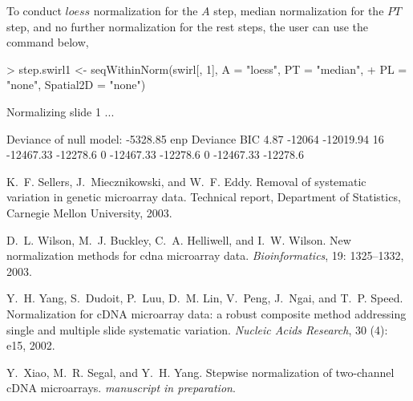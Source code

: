 \documentclass[11pt]{article}
\begin{document}
To conduct $loess$ normalization for the $A$ step, median normalization for the $PT$ step, and
no further normalization for the rest steps, the user can use the command below,

\begin{Schunk}
\begin{Sinput}
> step.swirl1 <- seqWithinNorm(swirl[, 1], A = "loess", PT = "median", 
+     PL = "none", Spatial2D = "none")
\end{Sinput}
\begin{Soutput}
Normalizing slide  1 ...

Deviance of null model: -5328.85 
enp 	 Deviance 	 BIC 
4.87 	 -12064 	 -12019.94 
16 	 -12467.33 	 -12278.6 
0 	 -12467.33 	 -12278.6 
0 	 -12467.33 	 -12278.6 
\end{Soutput}
\end{Schunk}

\begin{thebibliography}{}

K.~F. Sellers, J.~Miecznikowski, and W.~F. Eddy.
\newblock Removal of systematic variation in genetic microarray data.
\newblock Technical report, Department of Statistics, Carnegie Mellon
  University, 2003.

D.~L. Wilson, M.~J. Buckley, C.~A. Helliwell, and I.~W. Wilson.
\newblock New normalization methods for cdna microarray data.
\newblock \emph{Bioinformatics}, 19: 1325--1332, 2003.

Y.~H. Yang, S.~Dudoit, P.~Luu, D.~M. Lin, V.~Peng, J.~Ngai, and T.~P. Speed.
\newblock Normalization for c{DNA} microarray data: a robust composite method
  addressing single and multiple slide systematic variation.
\newblock \emph{Nucleic Acids Research}, 30 (4): e15, 2002.

Y.~Xiao, M.~R. Segal, and Y.~H. Yang.
\newblock Stepwise normalization of two-channel c{DNA} microarrays.
\newblock \emph{manuscript in preparation}.

\end{thebibliography}
\end{document}
